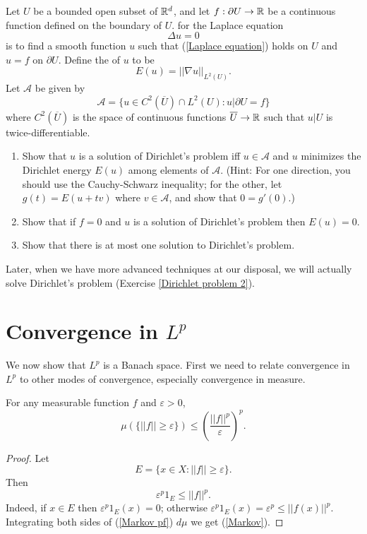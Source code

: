 \begin{exercise}
\label{Dirichlet problem}
Let $U$ be a bounded open subset of $\mathbb{R}^d$, and let $f: \partial U \to \mathbb{R}$ be a continuous function defined on the boundary of $U$.
 for the Laplace equation
\begin{equation}
\label{Laplace equation}
\Delta u = 0
\end{equation}
is to find a smooth function $u$ such that (\ref{Laplace equation}) holds on $U$ and $u = f$ on $\partial U$.
Define the  of $u$ to be
\[E(u) = ||\nabla u||_{L^2(U)}.\]
Let $\mathcal A$ be given by
\[\mathcal A = \{u \in C^2(\overline U) \cap L^2(U): u|\partial U = f\}\]
where $C^2(\overline U)$ is the space of continuous functions $\overline U \to \mathbb{R}$ such that $u|U$ is twice-differentiable.
\begin{enumerate}
\item Show that $u$ is a solution of Dirichlet's problem iff $u \in \mathcal A$ and $u$ minimizes the Dirichlet energy $E(u)$ among elements of $\mathcal A$.
(Hint: For one direction, you should use the Cauchy-Schwarz inequality; for the other, let $g(t) = E(u + tv)$ where $v \in \mathcal A$, and show that $0 = g'(0)$.)
\item Show that if $f = 0$ and $u$ is a solution of Dirichlet's problem then $E(u) = 0$.
\item Show that there is at most one solution to Dirichlet's problem.
\end{enumerate}
Later, when we have more advanced techniques at our disposal, we will actually solve Dirichlet's problem (Exercise \ref{Dirichlet problem 2}).
\end{exercise}

\section{Convergence in $L^p$}
We now show that $L^p$ is a Banach space.
First we need to relate convergence in $L^p$ to other modes of convergence, especially convergence in measure.

\begin{theorem}
For any measurable function $f$ and $\varepsilon > 0$,
\begin{equation}
\label{Markov}
\mu(\{||f|| \geq \varepsilon\}) \leq \left(\frac{||f||^p}{\varepsilon}\right)^p.
\end{equation}
\end{theorem}
\begin{proof}
Let
\[E = \{x \in X: ||f|| \geq \varepsilon\}.\]
Then
\begin{equation}
\label{Markov pf}
\varepsilon^{p} 1_{E} \leq ||f||^p.
\end{equation}
Indeed, if $x \in E$ then $\varepsilon^{p} 1_E(x) = 0$; otherwise $\varepsilon^{p} 1_E(x) = \varepsilon^{p} \leq ||f(x)||^p$.
Integrating both sides of (\ref{Markov pf}) $d\mu$ we get (\ref{Markov}).
\end{proof}

